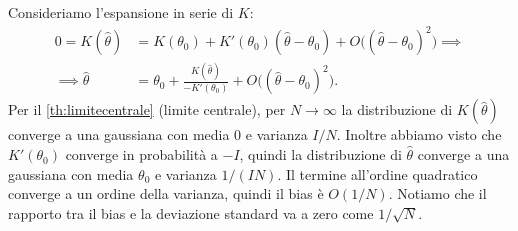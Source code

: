 %

Consideriamo l'espansione in serie di $K$:
\begin{align*}
	0 = K(\hat\theta)
	&= K(\theta_0) + K'(\theta_0)(\hat\theta-\theta_0) + O\big((\hat\theta-\theta_0)^2\big) \implies \\
	\implies \hat\theta
	&= \theta_0 + \frac{K(\hat\theta)}{-K'(\theta_0)} + O\big((\hat\theta-\theta_0)^2\big).
\end{align*}
Per il \autoref{th:limitecentrale} (limite centrale),
per $N\to\infty$
la distribuzione di $K(\hat\theta)$ converge a una gaussiana
con media 0 e varianza $I/N$.
Inoltre abbiamo visto che $K'(\theta_0)$ converge in probabilità a $-I$,
quindi la distribuzione di $\hat\theta$ converge a una gaussiana
con media $\theta_0$ e varianza $1/(IN)$.
Il termine all'ordine quadratico converge a un ordine della varianza,
quindi il bias è $O(1/N)$.
Notiamo che il rapporto tra il bias e la deviazione standard va a zero come $1/\sqrt{N}$.

